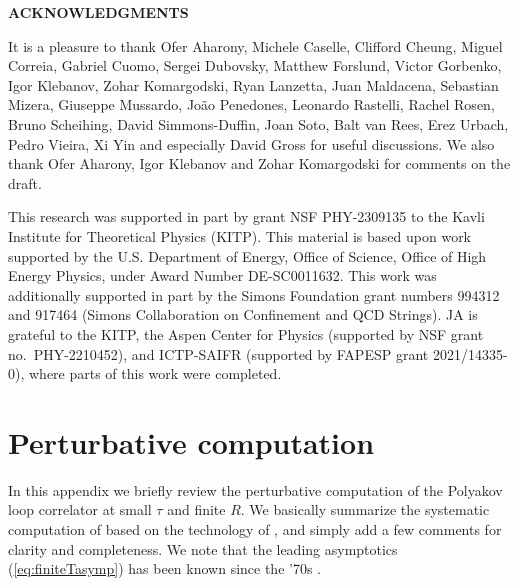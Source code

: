 \documentclass[
 reprint,
 amsmath,
 pre,
 amssymb,
 nofootinbib,
 aps,
 longbibliography,
]{revtex4-1}
\newcommand{\<}{{\langle}}
\renewcommand{\>}{{\rangle}}
\begin{document}
{\begin{center}{\textbf{ACKNOWLEDGMENTS}} \end{center}}


It is a pleasure to thank Ofer Aharony, Michele Caselle, Clifford Cheung, Miguel Correia, Gabriel Cuomo, Sergei Dubovsky, Matthew Forslund, Victor Gorbenko, Igor Klebanov, Zohar Komargodski, Ryan Lanzetta, Juan Maldacena, Sebastian Mizera, Giuseppe Mussardo, Jo\~ao Penedones, Leonardo Rastelli, Rachel Rosen, Bruno Scheihing, David Simmons-Duffin, Joan Soto, Balt van Rees, Erez Urbach, Pedro Vieira, Xi Yin and especially David Gross for useful discussions.
We also thank Ofer Aharony, Igor Klebanov and Zohar Komargodski for comments on the draft.

This research was supported in part by grant NSF PHY-2309135 to the Kavli Institute for Theoretical Physics (KITP). This material is based upon work supported by the U.S. Department of Energy, Office of Science, Office of High Energy Physics, under Award Number DE-SC0011632.
This work was additionally supported in part by the Simons Foundation grant numbers 994312 and 917464 (Simons Collaboration on Confinement and QCD Strings).
JA is grateful to the KITP, the Aspen Center for Physics (supported by NSF grant no.~PHY-2210452), and ICTP-SAIFR (supported by FAPESP grant 2021/14335-0), where parts of this work were completed.




\pagebreak
\newpage





\appendix


\section{Perturbative computation}\label{app:Perturb}

 \enlargethispage{0.25in}

In this appendix we briefly review the perturbative computation of the Polyakov loop correlator at small $\tau$ and finite $R$. We basically summarize the systematic computation of \cite{Berwein:2017thy} based on the technology of \cite{Gardi:2010rn,Gardi:2013ita}, and simply add a few comments for clarity and completeness. We note that the leading asymptotics (\ref{eq:finiteTasymp}) has been known since the '70s \cite{Brown:1979ya, McLerran:1981pb}.
\end{document}
